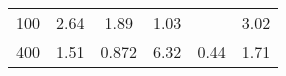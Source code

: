 \begin{samepage}
\begin{table}
\begin{tabular}{r c c c c c}
            100 & 2.64   & 1.89   & 1.03   &        & 3.02   \\
            400 & 1.51   & 0.872  & 6.32   & 0.44   & 1.71   \\

\end{tabular}
\end{table}
\end{samepage}
